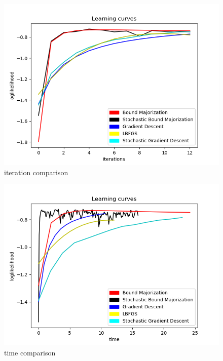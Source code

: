 \documentclass{beamer}
\begin{document}
\begin{frame}
\begin{block}{}
  \begin{figure}[htbp]
    \includegraphics[width = .85\textwidth]{iterations}
    \caption{iteration comparison}
  \end{figure}
\end{block}
\end{frame}

\begin{frame}
  \begin{block}{}
    \begin{figure}[htbp]
      \includegraphics[width = .85\textwidth]{time}
      \caption{time comparison}
    \end{figure}
  \end{block}
  \end{frame}
\end{document}
